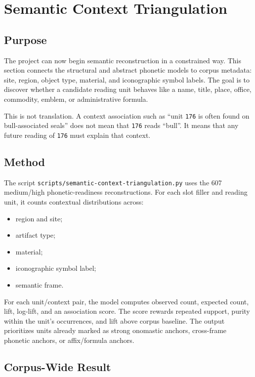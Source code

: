 \section{Semantic Context Triangulation}

\subsection{Purpose}

The project can now begin semantic reconstruction in a constrained way. This section connects the structural and abstract phonetic models to corpus metadata: site, region, object type, material, and iconographic symbol labels. The goal is to discover whether a candidate reading unit behaves like a name, title, place, office, commodity, emblem, or administrative formula.

This is not translation. A context association such as ``unit \texttt{176} is often found on bull-associated seals'' does not mean that \texttt{176} reads ``bull''. It means that any future reading of \texttt{176} must explain that context.

\subsection{Method}

The script \texttt{scripts/semantic-context-triangulation.py} uses the 607 medium/high phonetic-readiness reconstructions. For each slot filler and reading unit, it counts contextual distributions across:

\begin{itemize}
  \item region and site;
  \item artifact type;
  \item material;
  \item iconographic symbol label;
  \item semantic frame.
\end{itemize}

For each unit/context pair, the model computes observed count, expected count, lift, log-lift, and an association score. The score rewards repeated support, purity within the unit's occurrences, and lift above corpus baseline. The output prioritizes units already marked as strong onomastic anchors, cross-frame phonetic anchors, or affix/formula anchors.

\subsection{Corpus-Wide Result}


